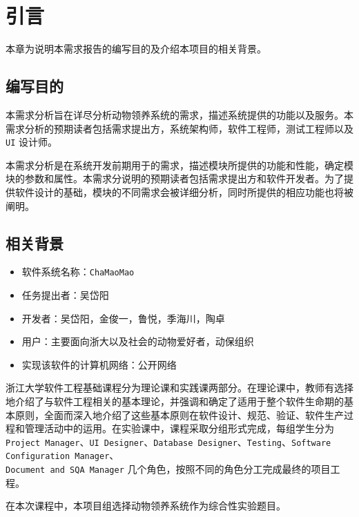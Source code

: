 \documentclass[12pt,a4paper,UTF8]{article}
\begin{document}

\maketoc    %

\section{引言}

本章为说明本需求报告的编写目的及介绍本项目的相关背景。 

\subsection{编写目的}

本需求分析旨在详尽分析动物领养系统的需求，描述系统提供的功能以及服务。本需求分析的预期读者包括需求提出方，系统架构师，软件工程师，测试工程师以及 \verb|UI| 设计师。

本需求分析是在系统开发前期用于的需求，描述模块所提供的功能和性能，确定模块的参数和属性。本需求分说明的预期读者包括需求提出方和软件开发者。为了提供软件设计的基础，模块的不同需求会被详细分析，同时所提供的相应功能也将被阐明。

\subsection{相关背景}

\begin{itemize}
  \item 软件系统名称：\verb|ChaMaoMao|
  \item 任务提出者：吴岱阳
  \item 开发者：吴岱阳，金俊一，鲁悦，季海川，陶卓
  \item 用户：主要面向浙大以及社会的动物爱好者，动保组织
  \item 实现该软件的计算机网络：公开网络
\end{itemize}

浙江大学软件工程基础课程分为理论课和实践课两部分。在理论课中，教师有选择地介绍了与软件工程相关的基本理论，并强调和确定了适用于整个软件生命期的基本原则，全面而深入地介绍了这些基本原则在软件设计、规范、验证、软件生产过程和管理活动中的运用。在实验课中，课程采取分组形式完成，每组学生分为 \verb|Project Manager|、\verb|UI Designer|、\verb|Database Designer|、\verb|Testing|、\verb|Software Configuration Manager|、\\ \verb|Document and SQA Manager| 几个角色，按照不同的角色分工完成最终的项目工程。

在本次课程中，本项目组选择动物领养系统作为综合性实验题目。
\end{document}
